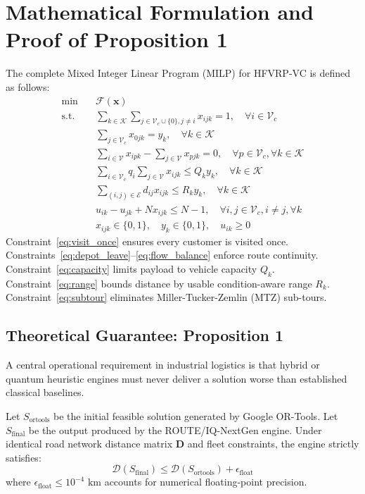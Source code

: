 \section{Mathematical Formulation and Proof of Proposition 1}
\label{sec:math_proof}
The complete Mixed Integer Linear Program (MILP) for HFVRP-VC is defined as follows:
\begin{align}
\min \quad & \mathcal{F}(\mathbf{x}) \\
\text{s.t.} \quad & \sum_{k \in \mathcal{K}} \sum_{j \in \mathcal{V}_c \cup \{0\}, j \ne i} x_{ijk} = 1, \quad \forall i \in \mathcal{V}_c \label{eq:visit_once} \\
& \sum_{j \in \mathcal{V}_c} x_{0jk} = y_k, \quad \forall k \in \mathcal{K} \label{eq:depot_leave} \\
& \sum_{i \in \mathcal{V}} x_{ipk} - \sum_{j \in \mathcal{V}} x_{pjk} = 0, \quad \forall p \in \mathcal{V}_c, \forall k \in \mathcal{K} \label{eq:flow_balance} \\
& \sum_{i \in \mathcal{V}_c} q_i \sum_{j \in \mathcal{V}} x_{ijk} \le Q_k y_k, \quad \forall k \in \mathcal{K} \label{eq:capacity} \\
& \sum_{(i,j) \in \mathcal{E}} d_{ij} x_{ijk} \le R_k y_k, \quad \forall k \in \mathcal{K} \label{eq:range} \\
& u_{ik} - u_{jk} + N x_{ijk} \le N - 1, \quad \forall i, j \in \mathcal{V}_c, i \ne j, \forall k \label{eq:subtour} \\
& x_{ijk} \in \{0, 1\}, \quad y_k \in \{0, 1\}, \quad u_{ik} \ge 0
\end{align}
Constraint~\eqref{eq:visit_once} ensures every customer is visited once. Constraints~\eqref{eq:depot_leave}--\eqref{eq:flow_balance} enforce route continuity. Constraint~\eqref{eq:capacity} limits payload to vehicle capacity $Q_k$. Constraint~\eqref{eq:range} bounds distance by usable condition-aware range $R_k$. Constraint~\eqref{eq:subtour} eliminates Miller-Tucker-Zemlin (MTZ) sub-tours.

\subsection{Theoretical Guarantee: Proposition 1}
A central operational requirement in industrial logistics is that hybrid or quantum heuristic engines must never deliver a solution worse than established classical baselines.

\begin{proposition}
\label{prop:guardrail}
Let $S_{\text{ortools}}$ be the initial feasible solution generated by Google OR-Tools. Let $S_{\text{final}}$ be the output produced by the ROUTE/IQ-NextGen engine. Under identical road network distance matrix $\mathbf{D}$ and fleet constraints, the engine strictly satisfies:
\begin{equation}
\mathcal{D}(S_{\text{final}}) \le \mathcal{D}(S_{\text{ortools}}) + \epsilon_{\text{float}}
\end{equation}
where $\epsilon_{\text{float}} \le 10^{-4}\text{ km}$ accounts for numerical floating-point precision.
\end{proposition}

